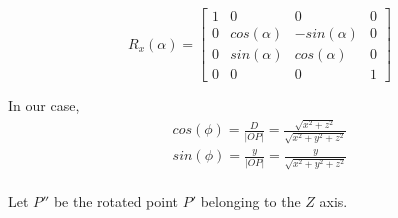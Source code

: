 \documentclass[a4paper,10pt]{article}
\begin{document}
\begin{equation}
R_x(\alpha) =
\begin{bmatrix}
	1  & 0 			& 0 		   & 0 \\
	0 & cos(\alpha) & -sin(\alpha) & 0 \\
	0 & sin(\alpha) & cos(\alpha)  & 0 \\
	0 & 0 			& 0 		   & 1
\end{bmatrix}
\end{equation}

\noindent
In our case,
\begin{equation}
\left.\begin{aligned}
&cos(\phi) = \frac{D}{|OP|} = \frac{\sqrt{x^2 + z^2}}{\sqrt{x^2 + y^2 + z^2}}&\\
&sin(\phi) = \frac{y}{|OP|} = \frac{y}{\sqrt{x^2 + y^2 + z^2}}&\\
\end{aligned}\right.
\end{equation}

\bigskip \noindent
Let $P''$ be the rotated point $P'$ belonging to the $Z$ axis.
\end{document}
